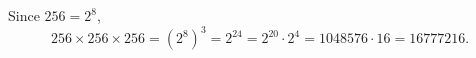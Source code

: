 Since $256=2^8$,
\[256\times256\times256=\left(2^8\right)^3=\boxed{2^{24}}=2^{20}\cdot2^4=1048576\cdot16=\boxed{16777216}.\]
